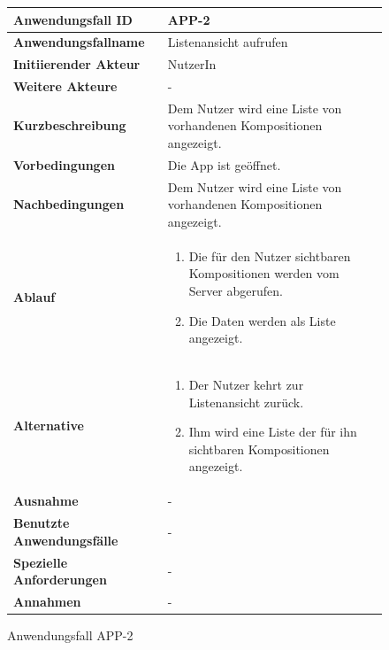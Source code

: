 \begin{figure}[h]
	\centering
	\begin{tabularx}{\textwidth}{ X | X }
		\textbf{Anwendungsfall ID} & APP-2 \\ \hline
		\textbf{Anwendungsfallname} & Listenansicht aufrufen \\ \hline
		\textbf{Initiierender Akteur} & NutzerIn \\ \hline
		\textbf{Weitere Akteure} & -  \\ \hline
		\textbf{Kurzbeschreibung} & Dem Nutzer wird eine Liste von vorhandenen Kompositionen angezeigt.  \\ \hline
		\textbf{Vorbedingungen} & Die App ist geöffnet.  \\ \hline
		\textbf{Nachbedingungen} & Dem Nutzer wird eine Liste von vorhandenen Kompositionen angezeigt.  \\ \hline
		\textbf{Ablauf} &
		\begin{enumerate}
			\item Die für den Nutzer sichtbaren Kompositionen werden vom Server abgerufen.
			\item Die Daten werden als Liste angezeigt.
		\end{enumerate} \\ \hline
		\textbf{Alternative} &
		\begin{enumerate}
			\item Der Nutzer kehrt zur Listenansicht zurück.
			\item Ihm wird eine Liste der für ihn sichtbaren Kompositionen angezeigt.
		\end{enumerate}  \\ \hline
		\textbf{Ausnahme} &
		-  \\ \hline
		\textbf{Benutzte Anwendungsfälle} & - \\ \hline
		\textbf{Spezielle Anforderungen} & - \\ \hline
		\textbf{Annahmen} & -
	\end{tabularx}
	\caption{Anwendungsfall APP-2}
	\label{fig:anwendungsfall-app-tabelle-APP-2}
\end{figure}

\newpage

